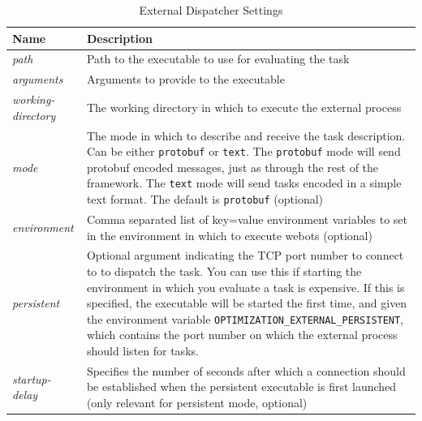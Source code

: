 \documentclass{report}
\begin{document}
\begin{table}[h!tb]\caption{External Dispatcher Settings}\label{tab:external_settings}\vspace{0.1in}
	\centering

	\begin{tabular}{p{3cm} p{12cm}}
		\toprule
		\textbf{Name} & \textbf{Description} \\
		\midrule
		\textit{path} & Path to the executable to use for evaluating the task \\
		\textit{arguments} & Arguments to provide to the executable \\
		\textit{working-directory} & The working directory in which to execute
		                             the external process \\
		\textit{mode} & The mode in which to describe and receive the task
		                description. Can be either \verb!protobuf! or
		                \verb!text!. The \verb!protobuf! mode will send protobuf
		                encoded messages, just as through the rest of the
		                framework. The \verb!text! mode will send tasks
		                encoded in a simple text format. The default is
		                \verb!protobuf! (optional)\\
		\textit{environment} & Comma separated list of key=value environment variables
		              to set in the environment in which to execute webots
		              (optional) \\
		\textit{persistent} & Optional argument indicating the TCP port number
		                      to connect to to dispatch the task. You can use
		                      this if starting the environment in which you
		                      evaluate a task is expensive. If this is specified,
		                      the executable will be started the first time, and
		                      given the environment variable
		                      \verb!OPTIMIZATION_EXTERNAL_PERSISTENT!, which
		                      contains the port number on which the external
		                      process should listen for tasks. \\
		\textit{startup-delay} & Specifies the number of seconds after which a
		                         connection should be established when the
		                         persistent executable is first launched (only
		                         relevant for persistent mode, optional) \\
		\bottomrule
	\end{tabular}
\end{table}
\end{document}
